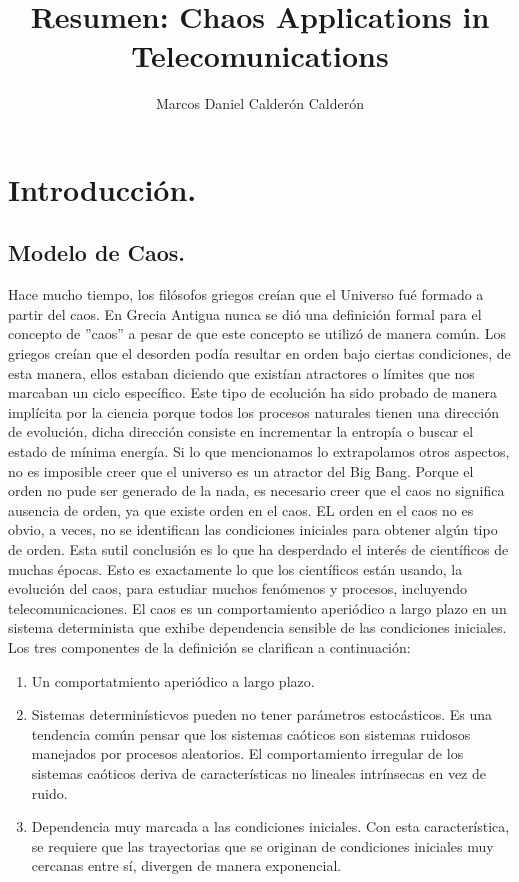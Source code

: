 \documentclass[prodmode,acmtap]{acmlarge}
\title{Resumen:  Chaos Applications in Telecomunications}
\author{Marcos Daniel Calderón Calderón \affil{CIMAT}
}
\begin{document}
\maketitle

\section{Introducción.}
\subsection{Modelo de Caos.}

Hace mucho tiempo, los filósofos griegos creían que el Universo fué formado a partir del caos. En Grecia Antigua nunca se dió una definición formal para el concepto de ''caos'' a pesar de que este concepto se utilizó de manera común. Los griegos creían que el desorden podía resultar en orden bajo ciertas condiciones, de esta manera, ellos estaban diciendo que existían atractores o límites que nos marcaban un ciclo específico. Este tipo de ecolución ha sido probado de manera implícita por la ciencia porque todos los procesos naturales tienen una dirección de evolución, dicha dirección consiste en incrementar la entropía o buscar el estado de mínima energía. Si lo que mencionamos lo extrapolamos otros aspectos, no es imposible creer que el universo es un atractor del Big Bang. Porque el orden no pude ser generado de la nada, es necesario creer que el caos no significa ausencia de orden, ya que existe orden en el caos. EL orden en el caos no es obvio, a veces, no se identifican las condiciones iniciales para obtener algún tipo de orden. Esta sutil conclusión es lo que ha desperdado el interés de científicos de muchas épocas. Esto es exactamente lo que los científicos están usando, la evolución del caos, para estudiar muchos fenómenos y procesos, incluyendo telecomunicaciones.
El caos es un comportamiento aperiódico a largo plazo en un sistema determinista que 
exhibe dependencia sensible de las condiciones iniciales. Los tres componentes de la definición se clarifican a continuación:

\begin{enumerate}
\item Un comportatmiento aperiódico a largo plazo.
\item Sistemas determinísticvos pueden no tener parámetros estocásticos. Es una tendencia común pensar que los sistemas caóticos son sistemas ruidosos manejados por procesos aleatorios. El comportamiento irregular de los sistemas caóticos deriva de características no lineales intrínsecas en vez de ruido.
\item Dependencia muy marcada a las condiciones iniciales. Con esta característica, se requiere que las trayectorias que se originan de condiciones iniciales muy cercanas entre sí, divergen de manera exponencial.
\end{enumerate}
\end{document}
